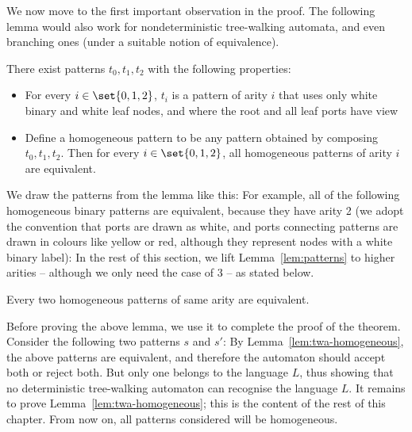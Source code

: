 We now move to the first important observation in the proof. The following lemma would also work for nondeterministic tree-walking automata, and even branching ones (under a suitable notion of equivalence).
\begin{lemma}\label{lem:patterns}
	There exist patterns $t_0,t_1,t_2$ with the following properties:
	\begin{itemize}
		\item For every $i \in \set{0,1,2}$, $t_i$ is a pattern of arity $i$ that  uses only white binary and white leaf nodes, and where the root and all leaf ports have view
		\item Define a homogeneous pattern to be any pattern obtained by composing $t_0,t_1,t_2$. Then for every $i \in \set{0,1,2}$, all homogeneous patterns of arity $i$ are equivalent.
	\end{itemize}
\end{lemma}
We draw the patterns from the lemma like this:
For example, all of the following homogeneous binary patterns are equivalent, because they have arity 2 (we adopt the convention that ports are drawn as white, and ports connecting patterns are drawn in colours like yellow or red, although they represent nodes with a white binary label):
 In the rest of this section, we  lift Lemma~\ref{lem:patterns} to higher arities -- although we only need the case of 3 -- as stated below.
\begin{lemma}\label{lem:twa-homogeneous}
	Every two homogeneous patterns of same arity are equivalent.
\end{lemma}

Before proving the above lemma, we use it to complete the proof of the theorem. Consider the following two patterns $s$ and $s'$:
By Lemma~\ref{lem:twa-homogeneous}, the above patterns are equivalent, and therefore the automaton should accept both or reject both. But only one belongs to the language $L$, thus showing that no deterministic tree-walking automaton can recognise the language $L$.  It remains to prove Lemma~\ref{lem:twa-homogeneous}; this is the content of the rest of this chapter. From now on, all patterns considered will be homogeneous.

%

